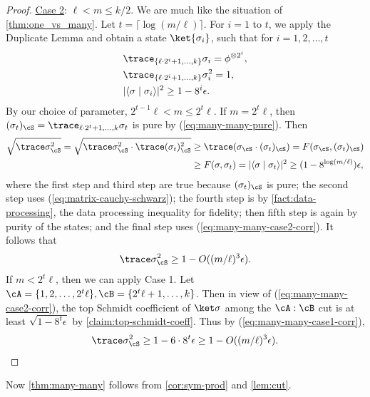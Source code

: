 \begin{proof}
\uline{Case 2}: $\ell < m \le k/2$. We are much like the situation of \cref{thm:one_vs_many}. Let $t = \lceil \log (m / \ell) \rceil$. For $i=1$ to $t$, we apply the Duplicate Lemma and obtain a state $\ket{\sigma_i}$, such that for $i=1,2,\ldots, t$
\begin{align}
    &\trace_{\{\ell\cdot 2^i+1,\ldots, k\}}\sigma_i = \phi ^{\otimes 2^i},
    \nonumber \\
    &\trace_{\{\ell\cdot 2^i+1,\ldots, k\}}\sigma_i^2 = 1,
    \label{eq:many-many-pure} \\
    &|\langle \sigma \mid \sigma_i \rangle|^2 \ge 1-8^i \epsilon.
    \label{eq:many-many-case2-corr}
\end{align}
By our choice of parameter, $2^{t-1}\ell < m \le 2^{t}\ell$. If $m=2^t \ell$, then $(\sigma_t)_\cS = \trace_{\ell\cdot2^t+1,\ldots,k}\sigma_t$ is pure by (\ref{eq:many-many-pure}). Then  
\begin{align*}
    \sqrt {\trace\sigma_\cS^2} =  \sqrt{\trace \sigma_\cS ^2 \cdot \trace (\sigma_t)_\cS^2} &\ge \trace(\sigma_\cS\cdot (\sigma_t)_\cS) = F(\sigma_\cS, (\sigma_t)_\cS) \\
    &\ge F(\sigma, \sigma_t)  = |\langle \sigma \mid \sigma_t\rangle|^2 \ge (1-8^{\log(m/\ell)})\epsilon,
\end{align*}
where the first step and third step are true because $(\sigma_t)_\cS$ is pure; the second step uses (\ref{eq:matrix-cauchy-schwarz}); the fourth step is by \cref{fact:data-processing}, the data processing inequality for fidelity; then fifth step is again by purity of the states; and the final step uses (\ref{eq:many-many-case2-corr}). It follows that
\[
    \trace \sigma_\cS^2 \ge 1 - O((m/\ell)^3\epsilon).
\]
If $m<2^t\ell$, then we can apply Case 1. 
Let $\cA= \{1,2,\ldots,2^t\ell\}, \cB = \{2^t\ell+1, \ldots, k\}$. Then in view of (\ref{eq:many-many-case2-corr}), the top Schmidt coefficient of $\ket\sigma$ among the $\cA : \cB$ cut is at least $\sqrt{1-8^t\epsilon}$ by \cref{claim:top-schmidt-coeff}. Thus by (\ref{eq:many-many-case1-corr}),
\[
    \trace \sigma_\cS^2 \ge 1-6\cdot 8^t\epsilon\ge 1-O((m/\ell)^3\epsilon).
\qedhere
\]
\end{proof}

Now \cref{thm:many-many} follows from \cref{cor:sym-prod} and \cref{lem:cut}.




